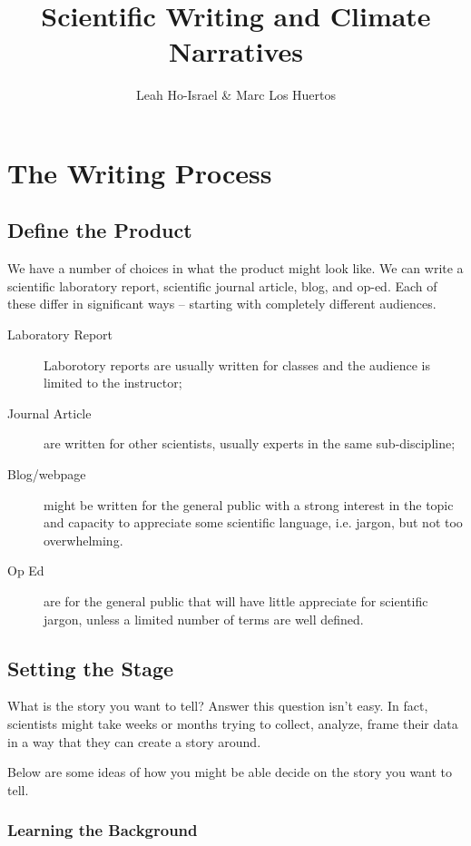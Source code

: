 \documentclass{article}\usepackage[]{graphicx}\usepackage[]{color}
\title{Scientific Writing and Climate Narratives}
\author{Leah Ho-Israel \& Marc Los Huertos}
\begin{document}
\maketitle

\section{The Writing Process}

\subsection{Define the Product}

We have a number of choices in what the product might look like. We can write a scientific laboratory report, scientific journal article, blog, and op-ed. Each of these differ in significant ways -- starting with completely different audiences. 

\begin{description}
\item[Laboratory Report] Laborotory reports are usually written for classes and the audience is limited to the instructor;
\item[Journal Article] are written for other scientists, usually experts in the same sub-discipline;
\item[Blog/webpage] might be written for the general public with a strong interest in the topic and capacity to appreciate some scientific language, i.e. jargon, but not too overwhelming.
\item[Op Ed] are for the general public that will have little appreciate for scientific jargon, unless a limited number of terms are well defined. 
\end{description}

\subsection{Setting the Stage}

What is the story you want to tell? Answer this question isn't easy. In fact, scientists might take weeks or months trying to collect, analyze, frame their data in a way that they can create a story around. 

Below are some ideas of how you might be able decide on the story you want to tell. 

\subsubsection{Learning the Background}
\end{document}
